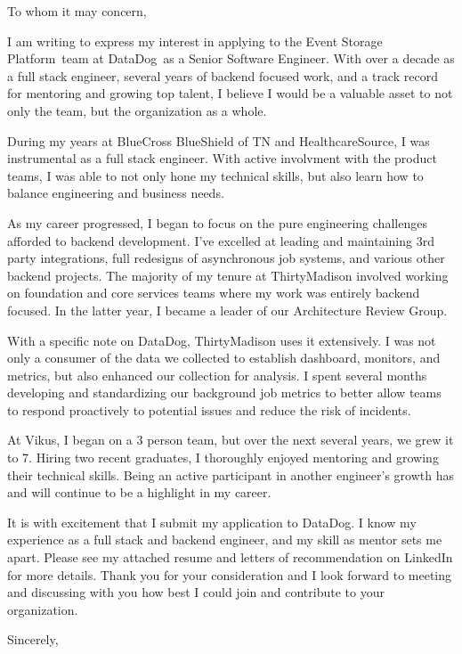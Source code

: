 
\usepackage{parskip}

\newcommand{\applyteam}{Event Storage Platform}
\newcommand{\applycompany}{DataDog}
\newcommand{\applyrole}{Senior Software Engineer}





To whom it may concern,

I am writing to express my interest in applying to the \applyteam\ team at \applycompany\ as a \applyrole.
With over a decade as a full stack engineer, several years of backend focused work, and a track record for
mentoring and growing top talent, I believe I would be a valuable asset to not only the team, but the
organization as a whole.

During my years at BlueCross BlueShield of TN and HealthcareSource, I was instrumental as a full stack
engineer. With active involvment with the product teams, I was able to not only hone my technical skills,
but also learn how to balance engineering and business needs.

As my career progressed, I began to focus on the pure engineering challenges afforded
to backend development. I've excelled at leading and maintaining 3rd party integrations, full redesigns of
asynchronous job systems, and various other backend projects. The majority of my tenure at ThirtyMadison
involved working on foundation and core services teams where my work was entirely backend focused. In the
latter year, I became a leader of our Architecture Review Group.

With a specific note on DataDog, ThirtyMadison uses it extensively. I was not only a consumer of the data
we collected to establish dashboard, monitors, and metrics, but also enhanced our collection for analysis.
I spent several months developing and standardizing our background job metrics to better allow teams to
respond proactively to potential issues and reduce the risk of incidents.

At Vikus, I began on a 3 person team, but over the next several years, we grew it to 7.
Hiring two recent graduates, I thoroughly enjoyed mentoring and growing their technical skills. Being 
an active participant in another engineer's growth has and will continue to be a highlight in my career.

It is with excitement that I submit my application to \applycompany. I know my experience as a
full stack and backend engineer, and my skill as mentor sets me apart. Please see my attached resume and
letters of recommendation on LinkedIn for more details. Thank you for your consideration and I look forward
to meeting and discussing with you how best I could join and contribute to your organization.

\hfill \break
Sincerely,\\
\name

